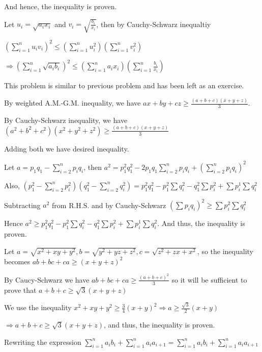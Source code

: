   And hence, the inequality is proven.
\item Let $u_i = \sqrt{a_ix_i}$ and $v_i = \sqrt{\frac{b_i}{x_i}}$, then by Cauchy-Schwarz inequaltiy

  $\displaystyle\left( \sum_{i=1}^n u_i v_i \right)^2 \leq \left( \sum_{i=1}^n u_i^2 \right) \left( \sum_{i=1}^n
  v_i^2 \right)$

  $\Rightarrow\displaystyle \left( \sum_{i=1}^n \sqrt{a_i b_i} \right)^2 \leq \left( \sum_{i=1}^n a_i
  x_i \right) \left( \sum_{i=1}^n \frac{b_i}{x_i} \right)$
\item This problem is similar to previous problem and has been left as an exercise.
\item By weighted A.M.-G.M. inequality, we have $ax + by + cz\geq \frac{(a + b + c)(x + y + z)}{3}$.

  By Cauchy-Schwarz inequality, we have $(a^2 + b^2 + c^2)(x^2 + y^2 + z^2)\geq \frac{(a + b + c)(x + y +
    z)}{3}$

  Adding both we have desired inequality.
\item Let $a = p_1q_1 - \displaystyle\sum_{i = 2}^np_iq_i$, then $a^2 = p_1^2q_1^2 -
  2p_1q_1\displaystyle\sum_{i = 2}^np_iq_i + \left(\sum_{i = 2}^np_iq_i\right)^2$

  Also, $\displaystyle\left(p_1^2 - \sum_{i = 2}^np_i^2\right)\left(q_1^2 - \sum_{i = 2}^nq_i^2\right) =
  p_1^2q_1^2 - p_1^2\sum q_i^2 - q_1^2\sum p_i^2 + \sum p_i^1\sum q_i^2$

  Subtracting $a^2$ from R.H.S. and by Cauchy-Schwarz $\left(\displaystyle\sum p_iq_i\right)^2\geq \sum
  p_i^2\sum q_i^2$

  Hence $a^2\geq p_1^2q_1^2 - p_1^2\sum q_i^2 - q_1^2\sum p_i^2 + \sum p_i^1\sum q_i^2$. And thus, the
  inequality is proven.
\item Let $a = \sqrt{x^2 + xy + y^2}, b = \sqrt{y^2 + yz + z^2}, c = \sqrt{z^2 + zx + x^2}$, so the
  inequality becomes $ab + bc + ca\geq (x + y + z)^2$

  By Caucy-Schwarz we have $ab + bc + ca\geq \frac{(a + b + c)^2}{3}$ so it will be sufficient to prove that
  $a + b + c\geq \sqrt{3}(x + y + z)$

  We use the inequality $x^2 + xy + y^2\geq \frac{3}{4}(x + y)^2\Rightarrow a\geq \frac{\sqrt{3}}{2}(x + y)$

  $\Rightarrow a + b + c\geq \sqrt{3}(x + y + z)$, and thus, the inequality is proven.
\item Rewriting the expression $\displaystyle\sum_{i = 1}^na_ib_i + \sum_{i = 1}^na_ia_{i + 1} = \sum_{i =
  1}^na_ib_i + \sum_{i = 1}^na_ia_{i + 1}$

